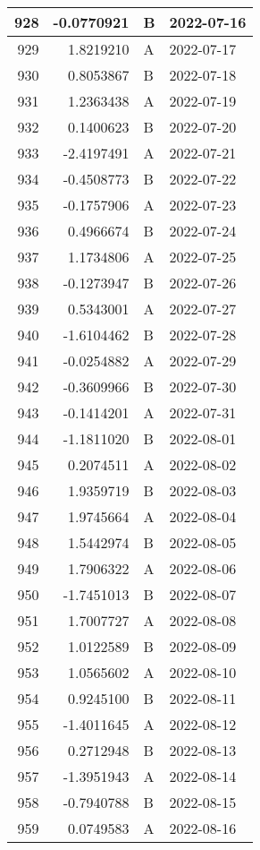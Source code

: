 \begin{tabular}{r|r|l|l}
\hline
928 & -0.0770921 & B & 2022-07-16\\
\hline
929 & 1.8219210 & A & 2022-07-17\\
\hline
930 & 0.8053867 & B & 2022-07-18\\
\hline
931 & 1.2363438 & A & 2022-07-19\\
\hline
932 & 0.1400623 & B & 2022-07-20\\
\hline
933 & -2.4197491 & A & 2022-07-21\\
\hline
934 & -0.4508773 & B & 2022-07-22\\
\hline
935 & -0.1757906 & A & 2022-07-23\\
\hline
936 & 0.4966674 & B & 2022-07-24\\
\hline
937 & 1.1734806 & A & 2022-07-25\\
\hline
938 & -0.1273947 & B & 2022-07-26\\
\hline
939 & 0.5343001 & A & 2022-07-27\\
\hline
940 & -1.6104462 & B & 2022-07-28\\
\hline
941 & -0.0254882 & A & 2022-07-29\\
\hline
942 & -0.3609966 & B & 2022-07-30\\
\hline
943 & -0.1414201 & A & 2022-07-31\\
\hline
944 & -1.1811020 & B & 2022-08-01\\
\hline
945 & 0.2074511 & A & 2022-08-02\\
\hline
946 & 1.9359719 & B & 2022-08-03\\
\hline
947 & 1.9745664 & A & 2022-08-04\\
\hline
948 & 1.5442974 & B & 2022-08-05\\
\hline
949 & 1.7906322 & A & 2022-08-06\\
\hline
950 & -1.7451013 & B & 2022-08-07\\
\hline
951 & 1.7007727 & A & 2022-08-08\\
\hline
952 & 1.0122589 & B & 2022-08-09\\
\hline
953 & 1.0565602 & A & 2022-08-10\\
\hline
954 & 0.9245100 & B & 2022-08-11\\
\hline
955 & -1.4011645 & A & 2022-08-12\\
\hline
956 & 0.2712948 & B & 2022-08-13\\
\hline
957 & -1.3951943 & A & 2022-08-14\\
\hline
958 & -0.7940788 & B & 2022-08-15\\
\hline
959 & 0.0749583 & A & 2022-08-16\\

\end{tabular}
